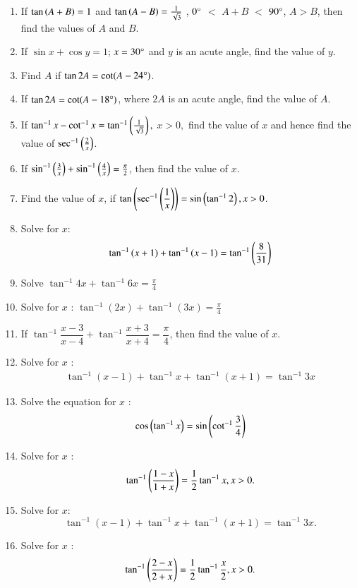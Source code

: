 \begin{enumerate}[label=\thesubsection.\arabic*,ref=\thesubsection.\theenumi,itemsep=1pt]
\item If $\tan \left(A + B\right) = 1$ and $\tan \left(A - B\right) = \frac{1}{\sqrt{3}}$ , $0\degree$ $<$ $A + B$ $<$ $90\degree$, $A > B$, then find the values of $A$ and $B$.
%
\hfill{}
\item If $\sin{x} + \cos{y}= 1$; $x=30\degree$  and  $y$ is an acute angle, find the value of $y$.
\hfill{}
\item Find $A$ if $\tan 2A = \cot (A-24\degree)$.
  \hfill{}
\item If $\tan2A = \cot(A-18\degree)$, where $2A$ is an acute angle, find the value of $A$.
\hfill{}
\item If $\tan^{-1}{x} - \cot^{-1} {x}= \tan^{-1}\left(\frac{1}{\sqrt{3}}\right),$ $x > 0,$ find the value of $x$ and hence find the value of $\sec^{-1}\left(\frac{2}{x}\right)$.
 \hfill{}\item If $\sin^{-1}\left(\frac{3}{x}\right) + \sin^{-1}\left(\frac{4}{x}\right) = \frac{\pi}{2}$, then find the value of $x$.
 \hfill{}\item Find  the value of $x$, if $\tan\left(\sec^{-1}\left(\dfrac{1}{x}\right)\right)  = \sin \left(\tan^{-1}{2}\right),x>0$.
%
\hfill{}
\item Solve for $x$:
	\begin{align*}
	\tan^{-1}\left(x+1\right)+\tan^{-1}\left(x-1\right)=\tan^{-1}\left(\dfrac{8}{31}\right)
	\end{align*}
\hfill{}
\item Solve  $\tan^{-1}4x+\tan^{-1}6x=\frac{\pi}{4}$
\hfill{}
\item Solve for $x$ :  $\tan^{-1}(2x)+\tan^{-1}(3x)=\frac{\pi}{4}$
\hfill{}
%
\item If $\tan^{-1}\dfrac{x-3}{x-4} + \tan^{-1}\dfrac{x+3}{x+4} =\dfrac{\pi}{4}$, then find the value of $x$.
\hfill{}
\item Solve for $x$ :
	\begin{align*}
		 \tan^{-1}(x-1) + \tan^{-1}x + \tan^{-1}(x+1) = \tan^{-1}3x
	\end{align*}
	\hfill{}
\item Solve the equation for $x$ :
	\begin{align*}
	\cos\left(\tan^{-1}x\right) = \sin\left(\cot^{-1}\frac{3}{4}\right)
	\end{align*}
\hfill{}
\item Solve for $x$ : $$\tan^{-1}\left(\frac{1-x}{1+x}\right) = \frac{1}{2}\tan^{-1}x, x>0.$$
\hfill{}
\item Solve for $x$: $$\tan^{-1}(x-1) + \tan^{-1}x + \tan^{-1}(x+1) = \tan^{-1}3x.$$
\hfill{}
\item Solve for $x$ : $$\tan^{-1}\left(\frac{2-x}{2+x}\right) = \frac{1}{2} \tan^{-1}\frac{x}{2}, x>0.$$
\hfill{}

\end{enumerate}
